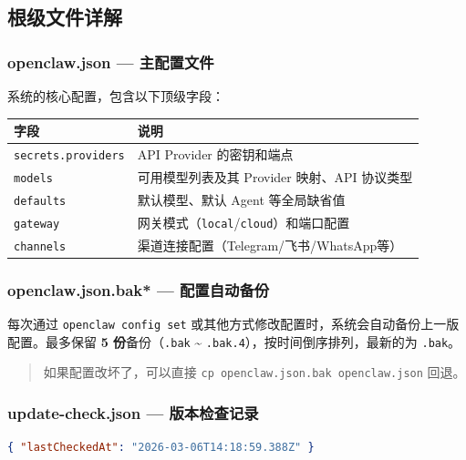 \subsection{根级文件详解}


\subsubsection{openclaw.json --- 主配置文件}


系统的核心配置，包含以下顶级字段：

\begin{table}[h]
\centering
\small
\begin{tabular}{|l|l|}
\hline
字段 & 说明 \\
\hline
\texttt{secrets.providers} & API Provider 的密钥和端点 \\
\hline
\texttt{models} & 可用模型列表及其 Provider 映射、API 协议类型 \\
\hline
\texttt{defaults} & 默认模型、默认 Agent 等全局缺省值 \\
\hline
\texttt{gateway} & 网关模式（\texttt{local}/\texttt{cloud}）和端口配置 \\
\hline
\texttt{channels} & 渠道连接配置（Telegram/飞书/WhatsApp等） \\
\hline
\end{tabular}
\end{table}

\subsubsection{openclaw.json.bak* --- 配置自动备份}


每次通过 \texttt{openclaw config set} 或其他方式修改配置时，系统会自动备份上一版配置。最多保留 \textbf{5 份}备份（\texttt{.bak} \textasciitilde{} \texttt{.bak.4}），按时间倒序排列，最新的为 \texttt{.bak}。

\begin{quote}
如果配置改坏了，可以直接 \texttt{cp openclaw.json.bak openclaw.json} 回退。
\end{quote}

\subsubsection{update-check.json --- 版本检查记录}


\begin{lstlisting}[language=json]
{ "lastCheckedAt": "2026-03-06T14:18:59.388Z" }
\end{lstlisting}

